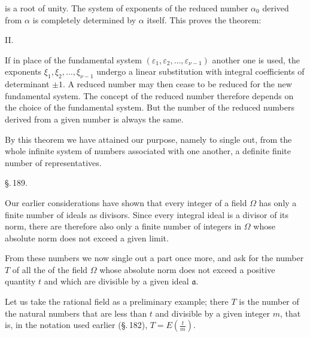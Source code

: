 is a root of unity. The system of exponents of the reduced number
$\alpha_0$ derived from $\alpha$ is completely determined by $\alpha$ itself.
This proves the theorem:

II. 

If in place of the fundamental system $(\varepsilon_1, \varepsilon_2, \ldots, \varepsilon_{\nu-1})$ another
one is used, the exponents $\xi_1, \xi_2, \ldots, \xi_{\nu-1}$ undergo
a linear substitution with integral coefficients of determinant $\pm 1$.
A reduced number may then cease to be reduced for the new fundamental
system. The concept of the reduced number
therefore depends on the choice of the fundamental system. But the
number of the reduced numbers derived from a given number
is always the same.

By this theorem we have attained our purpose, namely to single
out, from the whole infinite system of numbers associated with one
another, a definite finite number of representatives.

\begin{center}
\S.\,189.\\[4pt]
\end{center}

Our earlier considerations have shown that every
integer of a field $\Omega$ has only a finite number of ideals
as divisors. Since every integral ideal is a divisor of its norm,
there are therefore also only a finite number of integers
in $\Omega$ whose absolute norm does not exceed a given
limit.

From these numbers we now single out a part once more,
and ask for the number $T$ of all the 
of the field $\Omega$ whose absolute norm does not exceed a positive quantity $t$
and which are divisible by a given ideal $\mathfrak{a}$.

Let us take the rational field as a preliminary example;
there $T$ is the number of the natural numbers that are less than
$t$ and divisible by a given integer $m$, that is, in
the notation used earlier (\S.\,182), $T = E\left(\frac{t}{m}\right)$.
